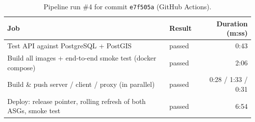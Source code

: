 \documentclass[10pt,a4paper]{article}
\begin{document}
\begin{table}[H]\centering\small
\caption{Pipeline run \#4 for commit \texttt{e7f505a} (GitHub Actions).}\label{tab:run}
\begin{tabularx}{\linewidth}{@{}L l r@{}}
\toprule
Job & Result & Duration (m:ss) \\
\midrule
Test API against PostgreSQL + PostGIS & passed & 0:43 \\
Build all images + end-to-end smoke test (docker compose) & passed & 2:06 \\
Build \& push server / client / proxy (in parallel) & passed & 0:28 / 1:33 / 0:31 \\
Deploy: release pointer, rolling refresh of both ASGs, smoke test & passed & 6:54 \\
\bottomrule
\end{tabularx}
\end{table}

\end{document}
